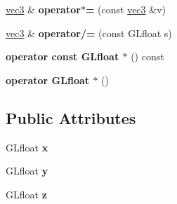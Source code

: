 \begin{DoxyCompactItemize}
\item 
\hypertarget{struct_angel_1_1vec3_a54e75f1d64f773d99f0d5e80b031142b}{\hyperlink{struct_angel_1_1vec3}{vec3} \& {\bfseries operator$\ast$=} (const \hyperlink{struct_angel_1_1vec3}{vec3} \&v)}\label{struct_angel_1_1vec3_a54e75f1d64f773d99f0d5e80b031142b}

\item 
\hypertarget{struct_angel_1_1vec3_ae3ac03ba1ce7c8bbb8dfe07c7e0d06d9}{\hyperlink{struct_angel_1_1vec3}{vec3} \& {\bfseries operator/=} (const \-G\-Lfloat s)}\label{struct_angel_1_1vec3_ae3ac03ba1ce7c8bbb8dfe07c7e0d06d9}

\item 
\hypertarget{struct_angel_1_1vec3_a81f4a99d68722e756664907dcb07fb92}{{\bfseries operator const G\-Lfloat $\ast$} () const }\label{struct_angel_1_1vec3_a81f4a99d68722e756664907dcb07fb92}

\item 
\hypertarget{struct_angel_1_1vec3_ab92761f9bc4454117c1dd39a7d87c1b0}{{\bfseries operator G\-Lfloat $\ast$} ()}\label{struct_angel_1_1vec3_ab92761f9bc4454117c1dd39a7d87c1b0}

\end{DoxyCompactItemize}
\subsection*{\-Public \-Attributes}
\begin{DoxyCompactItemize}
\item 
\hypertarget{struct_angel_1_1vec3_a758dbe298cc37615770c30a73066253d}{\-G\-Lfloat {\bfseries x}}\label{struct_angel_1_1vec3_a758dbe298cc37615770c30a73066253d}

\item 
\hypertarget{struct_angel_1_1vec3_a02608203e694798c3118d5b55a0e0048}{\-G\-Lfloat {\bfseries y}}\label{struct_angel_1_1vec3_a02608203e694798c3118d5b55a0e0048}

\item 
\hypertarget{struct_angel_1_1vec3_afa2e7231c4170ddedb556ef5f7941cbc}{\-G\-Lfloat {\bfseries z}}\label{struct_angel_1_1vec3_afa2e7231c4170ddedb556ef5f7941cbc}

\end{DoxyCompactItemize}
